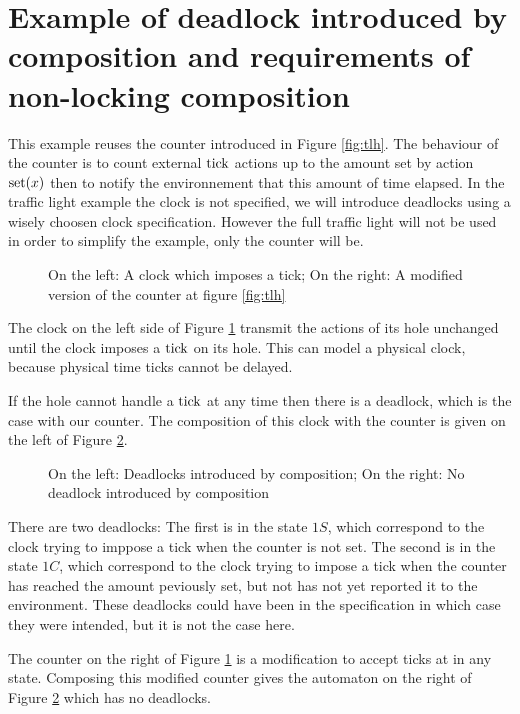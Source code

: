 \documentclass{article}
\begin{document}
\section{Example of deadlock introduced by composition and requirements of non-locking composition}\label{apx:lockcomp}
\begin{exi}
This example reuses the counter introduced in Figure \ref{fig:tlh}.
The behaviour of the counter is to count external \(\mathrm{tick}\) actions up to the amount set by action \(\mathrm{set}{\left(x\right)}\) then to notify the environnement that this amount of time elapsed.
In the traffic light example the clock is not specified, we will introduce deadlocks using a wisely choosen clock specification.
However the full traffic light will not be used in order to simplify the example, only the counter will be.

\begin{figure}

\vrule

\caption{On the left: A clock which imposes a tick; On the right: A modified version of the counter at figure \ref{fig:tlh}}
\label{fig:anytick}
\end{figure}
The clock on the left side of Figure \ref{fig:anytick} transmit the actions of its hole unchanged until the clock imposes a \(\mathrm{tick}\) on its hole.
This can model a physical clock, because physical time ticks cannot be delayed.

If the hole cannot handle a \(\mathrm{tick}\) at any time then there is a deadlock, which is the case with our counter.
The composition of this clock with the counter is given on the left of Figure \ref{fig:deadlock}.
\begin{figure}

\vrule

\caption{On the left: Deadlocks introduced by composition; On the right: No deadlock introduced by composition}
\label{fig:deadlock}
\end{figure}
There are two deadlocks:
The first is in the state \(1S\), which correspond to the clock trying to imppose a tick when the counter is not set.
The second is in the state \(1C\), which correspond to the clock trying to impose a tick when the counter has reached the amount peviously set, but not has not yet reported it to the environment.
These deadlocks could have been in the specification in which case they were intended, but it is not the case here.

The counter on the right of Figure \ref{fig:anytick} is a modification to accept ticks at in any state.
Composing this modified counter gives the automaton on the right of Figure \ref{fig:deadlock} which has no deadlocks.


\end{exi}
\end{document}
